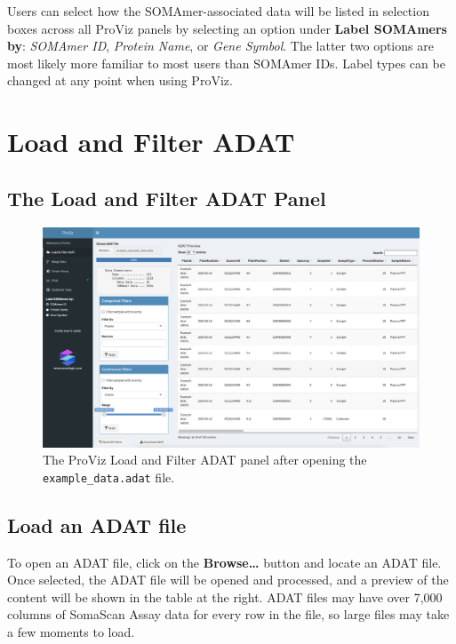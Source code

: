 \documentclass[
]{book}
\begin{document}
Users can select how the SOMAmer-associated data will be listed in selection boxes across all ProViz panels by selecting an option under \textbf{Label SOMAmers by}: \emph{SOMAmer ID}, \emph{Protein Name}, or \emph{Gene Symbol}. The latter two options are most likely more familiar to most users than SOMAmer IDs. Label types can be changed at any point when using ProViz.

\hypertarget{load-and-filter-adat}{%
\chapter{Load and Filter ADAT}\label{load-and-filter-adat}}

\hypertarget{the-load-and-filter-adat-panel}{%
\section{The Load and Filter ADAT Panel}\label{the-load-and-filter-adat-panel}}

\begin{figure}
\centering
\includegraphics{images/LoadAndFilter.png}
\caption{The ProViz Load and Filter ADAT panel after opening the \texttt{example\_data.adat} file.}
\end{figure}

\hypertarget{load-an-adat-file}{%
\section{Load an ADAT file}\label{load-an-adat-file}}

To open an ADAT file, click on the \textbf{Browse\ldots{}} button and locate an ADAT file. Once selected, the ADAT file will be opened and processed, and a preview of the content will be shown in the table at the right. ADAT files may have over 7,000 columns of SomaScan Assay data for every row in the file, so large files may take a few moments to load.
\end{document}
